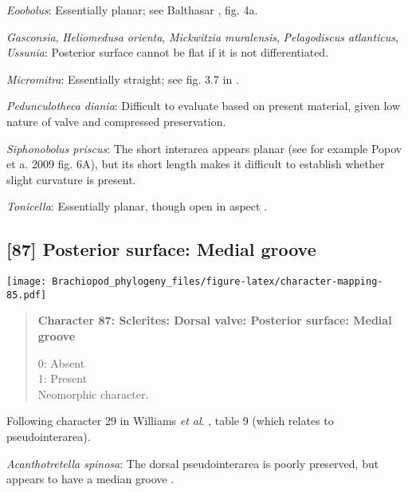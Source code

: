 \documentclass[openany]{book}
\theoremstyle{definition}
\theoremstyle{definition}
\theoremstyle{definition}
\theoremstyle{remark}
\begin{document}
\hypertarget{Eoobolus-coding-86}{}
\emph{Eoobolus}: Essentially planar; see Balthasar
\citeyearpar{Balthasar2009Thebrachiopod}, fig. 4a.

\hypertarget{Gasconsia-coding-86}{}
\emph{Gasconsia}, \emph{Heliomedusa orienta}, \emph{Mickwitzia
muralensis}, \emph{Pelagodiscus atlanticus}, \emph{Ussunia}: Posterior
surface cannot be flat if it is not differentiated.

\hypertarget{Micromitra-coding-86}{}
\emph{Micromitra}: Essentially straight; see fig. 3.7 in
\citet{Ushatinskaya2016Protegulumand}.

\hypertarget{Pedunculotheca_diania-coding-86}{}
\emph{Pedunculotheca diania}: Difficult to evaluate based on present
material, given low nature of valve and compressed preservation.

\hypertarget{Siphonobolus_priscus-coding-86}{}
\emph{Siphonobolus priscus}: The short interarea appears planar (see for
example Popov et a. 2009 fig. 6A), but its short length makes it
difficult to establish whether slight curvature is present.

\hypertarget{Tonicella-coding-86}{}
\emph{Tonicella}: Essentially planar, though open in aspect
\citep[following Chiton in][]{Schwabe2010}.

\subsection*{{[}87{]} Posterior surface: Medial
groove}\label{posterior-surface-medial-groove}

\texttt{[image: Brachiopod\_phylogeny\_files/figure-latex/character-mapping-85.pdf]}

\begin{quote}
\textbf{Character 87: Sclerites: Dorsal valve: Posterior surface: Medial
groove}

0: Absent\\
1: Present\\
Neomorphic character.
\end{quote}

Following character 29 in Williams \emph{et al}.
\citeyearpar{Williams2000LinguliformeaCraniiformea}, table 9 (which
relates to pseudointerarea).

\hypertarget{Acanthotretella_spinosa-coding-87}{}
\emph{Acanthotretella spinosa}: The dorsal pseudointerarea is poorly
preserved, but appears to have a median groove
\citep{Holmer2006Aspinose}.
\end{document}
